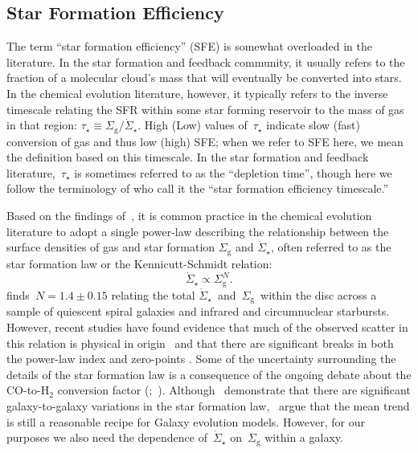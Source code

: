 \documentclass[draft2.tex]{subfiles}
\begin{document}
\subsection{Star Formation Efficiency} 
\label{sec:methods:sfe} 
The term ``star formation efficiency'' (SFE) is somewhat overloaded in the 
literature. 
In the star formation and feedback community, it usually refers to the fraction 
of a molecular cloud's mass that will eventually be converted into stars. 
In the chemical evolution literature, however, it typically refers to the 
inverse timescale relating the SFR within some star forming reservoir to the 
mass of gas in that region: 
$\tau_\star \equiv \Sigma_\text{g}/\dot{\Sigma}_\star$. 
High (Low) values of~$\tau_\star$ indicate slow (fast) conversion of gas and 
thus low (high) SFE; when we refer to SFE here, we mean the definition based on 
this timescale. 
In the star formation and feedback literature,~$\tau_\star$ is sometimes 
referred to as the ``depletion time'', though here we follow the terminology of 
\citet{Weinberg2017} who call it the ``star formation efficiency timescale.'' 
\par 
Based on the findings of~\citet{Kennicutt1998}, it is common practice in the 
chemical evolution literature to adopt a single power-law describing the 
relationship between the surface densities of gas and star formation 
$\Sigma_\text{g}$ and $\dot{\Sigma}_\star$, often referred to as the star 
formation law or the Kennicutt-Schmidt relation: 
\begin{equation} 
\dot{\Sigma}_\star \propto \Sigma_\text{g}^N. 
\end{equation} 
\citet{Kennicutt1998} finds~$N = 1.4 \pm 0.15$ relating the total 
$\dot{\Sigma}_\star$~and~$\Sigma_\text{g}$~within the disc across a sample of 
quiescent spiral galaxies and infrared and circumnuclear starbursts. 
However, recent studies have found evidence that much of the observed scatter 
in this relation is physical in origin~\citep{delosReyes2019} and that there 
are significant breaks in both the power-law index and zero-points 
\citep{Kennicutt2021}. 
Some of the uncertainty surrounding the details of the star formation law is a 
consequence of the ongoing debate about the CO-to-H$_2$ conversion factor 
(\citealp{Kennicutt2012};~\citealp*{Liu2015}). 
Although~\citet{Ellison2021} demonstrate that there are significant 
galaxy-to-galaxy variations in the star formation law,~\citet{delosReyes2019} 
argue that the mean trend is still a reasonable recipe for Galaxy evolution 
models. 
However, for our purposes we also need the dependence of~$\dot{\Sigma}_\star$ 
on~$\Sigma_\text{g}$ within a galaxy. 
\end{document}
